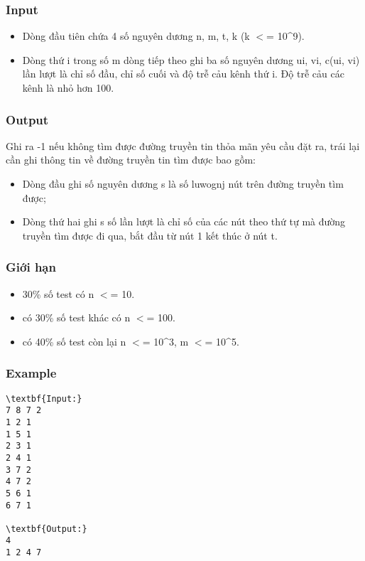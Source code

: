 \subsubsection{Input}
\begin{itemize}
	\item Dòng đầu tiên chứa 4 số nguyên dương n, m, t, k (k $<$= 10\textasciicircum9).
	\item Dòng thứ i trong số m dòng tiếp theo ghi ba số nguyên dương ui, vi, c(ui, vi) lần lượt là chỉ số đầu, chỉ số cuối và độ trễ cảu kênh thứ i. Độ trễ cảu các kênh là nhỏ hơn 100.
\end{itemize}

\subsubsection{Output}

Ghi ra -1 nếu không tìm được đường truyền tin thỏa mãn yêu cầu đặt ra, trái lại cần ghi thông tin về đường truyền tin tìm được bao gồm:
\begin{itemize}
	\item Dòng đầu ghi số nguyên dương s là số luwognj nút trên đường truyền tìm được;
	\item Dòng thứ hai ghi s số lần lượt là chỉ số của các nút theo thứ tự mà đường truyền tìm được đi qua, bắt đầu từ nút 1 kết thúc ở nút t.
\end{itemize}

\subsubsection{Giới hạn}
\begin{itemize}
	\item 30\% số test có n $<$= 10.
	\item có 30\% số test khác có n $<$= 100.
	\item có 40\% số test còn lại n $<$= 10\textasciicircum3, m $<$= 10\textasciicircum5.
\end{itemize}

\subsubsection{Example}
\begin{verbatim}
\textbf{Input:}
7 8 7 2
1 2 1
1 5 1
2 3 1
2 4 1
3 7 2
4 7 2
5 6 1
6 7 1

\textbf{Output:}
4
1 2 4 7
\end{verbatim}